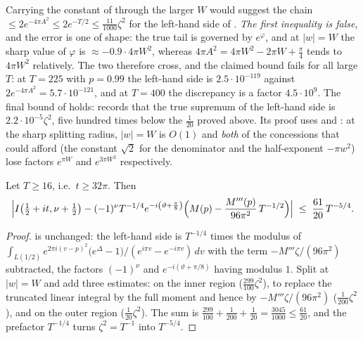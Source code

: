 \begin{remark}
\label{rem:rsf_outer_sharp_trap}
Carrying the constant of  through the larger $W$ would suggest the chain
$\le2e^{-4\pi A^{2}}\le2e^{-T/2}\le\tfrac{11}{1000}\zeta^{2}$ for the left-hand side of
.  \emph{The first inequality is false}, and the error is one of
shape: the true tail is
governed by $e^{\varphi}$, and at $\lvert w\rvert=W$ the sharp value of $\varphi$ is
$\approx-0.9\cdot4\pi W^{2}$, whereas $4\pi A^{2}=4\pi W^{2}-2\pi W+\tfrac\pi4$ tends to
$4\pi W^{2}$ relatively.  The two therefore cross, and the claimed bound fails for all large
$T$: at $T=225$ with $p=0.99$ the left-hand side is $2.5\cdot10^{-119}$ against
$2e^{-4\pi A^{2}}=5.7\cdot10^{-121}$, and at $T=400$ the discrepancy is a factor
$4.5\cdot10^{9}$.  The final bound of  holds:
 records that the true supremum of the left-hand side is
$2.2\cdot10^{-5}\zeta^{2}$, five hundred times below the $\tfrac1{20}$ proved above.  Its proof
uses  and : at the sharp splitting radius,
$\lvert w\rvert=W$ is $O(1)$ and \emph{both} of the concessions that  could
afford (the constant $\sqrt2$ for the denominator and the half-exponent $-\pi w^{2}$) lose
factors $e^{\pi W}$ and $e^{3\pi W^{2}}$ respectively.
\end{remark}

\begin{theorem}
\label{thm:rsf_saddle_sharp}
\leanok
{}
Let $T\ge16$, i.e.\ $t\ge32\pi$.  Then
\[
  \Bigl\lvert I\bigl(\tfrac12+it,\nu+\tfrac12\bigr)
    -(-1)^{\nu}T^{-1/4}e^{-i\left(\vartheta+\frac\pi8\right)}
      \Bigl(M(p)-\frac{M'''(p)}{96\pi^{2}}\,T^{-1/2}\Bigr)\Bigr\rvert
  \;\le\;\frac{61}{20}\,T^{-5/4}.
\]
\end{theorem}

\begin{proof}
\leanok
{}
 is unchanged: the left-hand side is $T^{-1/4}$ times the modulus of
$\int_{L(1/2)}e^{2\pi i(v-p)^{2}}\bigl(e^{\Delta}-1\bigr)\bigl/(e^{i\pi v}-e^{-i\pi v})\,dv$
with the term $-M'''\zeta/(96\pi^{2})$ subtracted, the factors $(-1)^{\nu}$ and
$e^{-i(\vartheta+\pi/8)}$ having modulus $1$.  Split at $\lvert w\rvert=W$ and add three
estimates:  on the inner region ($\tfrac{299}{100}\zeta^{2}$),
 to replace the truncated linear integral by the full moment and hence
by $-M'''\zeta/(96\pi^{2})$ ($\tfrac1{200}\zeta^{2}$), and  on the
outer region ($\tfrac1{20}\zeta^{2}$).  The sum is
$\tfrac{299}{100}+\tfrac1{200}+\tfrac1{20}=\tfrac{3045}{1000}\le\tfrac{61}{20}$, and the
prefactor $T^{-1/4}$ turns $\zeta^{2}=T^{-1}$ into $T^{-5/4}$.
\end{proof}

